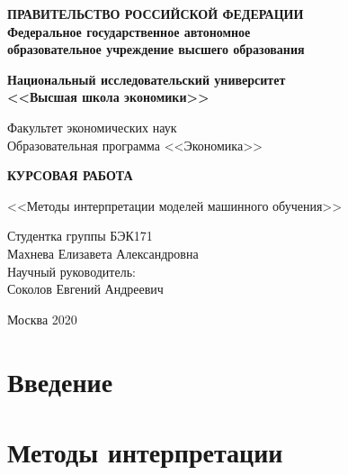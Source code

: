 \documentclass[a4paper, 12pt]{article}
\begin{document}
\thispagestyle{empty}
\begin{center}
	\textbf{ПРАВИТЕЛЬСТВО РОССИЙСКОЙ ФЕДЕРАЦИИ}\\
	\vspace{3ex}
	\textbf{Федеральное государственное автономное\\ образовательное учреждение высшего образования}
	
	\vspace{3ex}
	
	\textbf{Национальный исследовательский университет \\ <<Высшая школа экономики>>}
	
	\vspace{10ex}
	\begin{flushright}
		Факультет экономических наук\\
		Образовательная программа <<Экономика>>
	\end{flushright}
\end{center}
\vspace{12ex}

\begin{center}
	{\textbf{КУРСОВАЯ РАБОТА
	}}
	\vspace{1ex}
	
	<<Методы интерпретации моделей машинного обучения>>
\end{center}
\vspace{4ex}
\begin{flushright}
	\noindent
	Студентка группы БЭК171\\Махнева Елизавета Александровна\\
	\vspace{13ex}
	Научный руководитель:\\
	Соколов Евгений Андреевич
	
\end{flushright}	

\vfill

\begin{center}
	Москва 2020
	
\end{center}
\newpage
	\tableofcontents
	\newpage
	
	\section{Введение}
	
	\newpage
	
	\section{Методы интерпретации}
\end{document}
